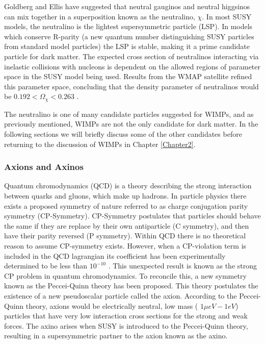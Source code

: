 \documentclass[a4paper,12pt]{article}
\begin{document}
Goldberg \cite{Goldberg} and Ellis \cite{Ellis} have suggested that neutral gauginos and neutral higgsinos can mix together in a superposition known as the neutralino, $\chi$.  In most SUSY models, the neutralino is the lightest supersymmetric particle (LSP).  In models which conserve R-parity (a new quantum number distinguishing SUSY particles from standard model particles) the LSP is stable, making it a prime candidate particle for dark matter.  The expected cross section of neutralinos interacting via inelastic collisions with nucleons is dependent on the allowed regions of parameter space in the SUSY model being used.  Results from the WMAP satellite refined this parameter space, concluding that the density parameter of neutralinos would be  $0.192 < \Omega_\chi < 0.263$ \cite{Spergel,Bennett,Arnowitt}.

The neutralino is one of many candidate particles suggested for WIMPs, and as previously mentioned, WIMPs are not the only candidate for dark matter.  In the following sections we will briefly discuss some of the other candidates before returning to the discussion of WIMPs in Chapter \ref{Chapter2}.

\subsubsection{Axions and Axinos}
Quantum chromodynamics (QCD) is a theory describing the strong interaction between quarks and gluons, which make up hadrons.  In particle physics there exists a proposed symmetry of nature referred to as charge conjugation parity symmetry (CP-Symmetry).  CP-Symmetry postulates that particles should behave the same if they are replace by their own antiparticle (C symmetry), and then have their parity reversed (P symmetry). Within QCD there is no theoretical reason to assume CP-symmetry exists.  However, when a CP-violation term is included in the QCD lagrangian its coefficient has been experimentally determined to be less than $10^{-10}$ \cite{Baluni}. This unexpected result is known as the strong CP problem in quantum chromodynamics.    To reconcile this, a new symmetry known as the Peccei-Quinn theory has been proposed.  This theory postulates the existence of a new pseudoscalar particle called the axion.  According to the Peccei-Quinn theory, axions would be electrically neutral, low mass ( $1\mu eV - 1 eV$) particles that have very low interaction cross sections for the strong and weak forces.  The axino arises when SUSY is introduced to the Peccei-Quinn theory, resulting in a supersymmetric partner to the axion known as the axino.
\end{document}
